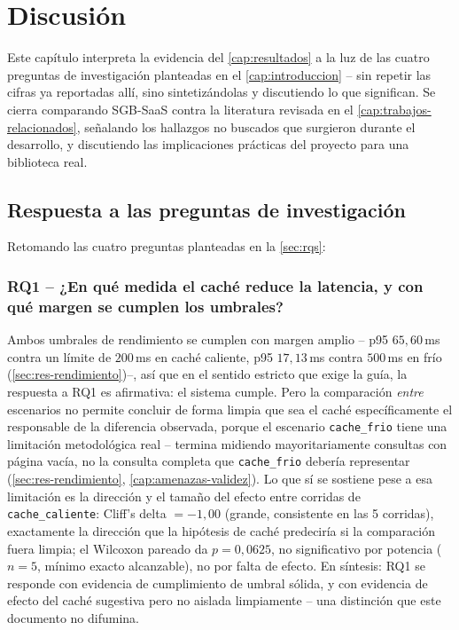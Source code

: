 \chapter{Discusión}
\label{cap:discusion}

Este capítulo interpreta la evidencia del \autoref{cap:resultados} a la
luz de las cuatro preguntas de investigación planteadas en el
\autoref{cap:introduccion} -- sin repetir las cifras ya reportadas allí,
sino sintetizándolas y discutiendo lo que significan. Se cierra
comparando SGB-SaaS contra la literatura revisada en el
\autoref{cap:trabajos-relacionados}, señalando los hallazgos no buscados
que surgieron durante el desarrollo, y discutiendo las implicaciones
prácticas del proyecto para una biblioteca real.

\section{Respuesta a las preguntas de investigación}
\label{sec:disc-rqs}

Retomando las cuatro preguntas planteadas en la
\autoref{sec:rqs}:

\subsection*{RQ1 -- ¿En qué medida el caché reduce la latencia, y con qué margen se cumplen los umbrales?}

Ambos umbrales de rendimiento se cumplen con margen amplio -- p95
$65{,}60$\,ms contra un límite de $200$\,ms en caché caliente, p95
$17{,}13$\,ms contra $500$\,ms en frío
(\autoref{sec:res-rendimiento})--, así que en el sentido estricto que
exige la guía, la respuesta a RQ1 es afirmativa: el sistema cumple. Pero
la comparación \emph{entre} escenarios no permite concluir de forma
limpia que sea el caché específicamente el responsable de la diferencia
observada, porque el escenario \texttt{cache\_frio} tiene una limitación
metodológica real -- termina midiendo mayoritariamente consultas con
página vacía, no la consulta completa que \texttt{cache\_frio} debería
representar (\autoref{sec:res-rendimiento},
\autoref{cap:amenazas-validez}). Lo que sí se sostiene pese a esa
limitación es la dirección y el tamaño del efecto entre corridas de
\texttt{cache\_caliente}: Cliff's delta $=-1{,}00$ (grande, consistente en
las 5 corridas), exactamente la dirección que la hipótesis de caché
predeciría si la comparación fuera limpia; el Wilcoxon pareado da
$p=0{,}0625$, no significativo por potencia ($n=5$, mínimo exacto
alcanzable), no por falta de efecto. En síntesis: RQ1 se responde
con evidencia de cumplimiento de umbral sólida, y con evidencia de efecto
del caché sugestiva pero no aislada limpiamente -- una distinción que
este documento no difumina.

